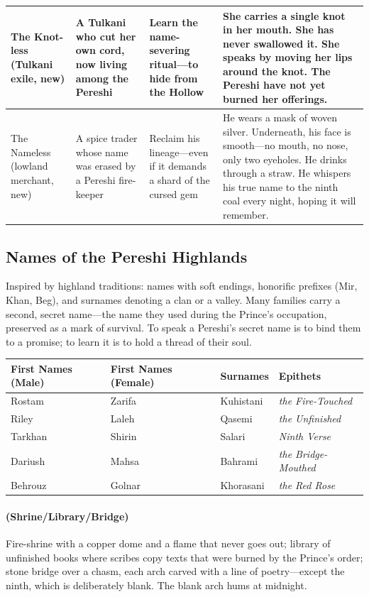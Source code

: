 \begin{longtable}{|p{}|p{}|p{}|p{}|}
\hline
The Knot-less (Tulkani exile, new) & A Tulkani who cut her own cord, now living among the Pereshi & Learn the name-severing ritual---to hide from the Hollow & She carries a single knot in her mouth. She has never swallowed it. She speaks by moving her lips around the knot. The Pereshi have not yet burned her offerings. \\
\hline
The Nameless (lowland merchant, new) & A spice trader whose name was erased by a Pereshi fire-keeper & Reclaim his lineage---even if it demands a shard of the cursed gem & He wears a mask of woven silver. Underneath, his face is smooth---no mouth, no nose, only two eyeholes. He drinks through a straw. He whispers his true name to the ninth coal every night, hoping it will remember. \\
\hline
\end{longtable}

\subsection*{Names of the Pereshi Highlands}
\label{sec:pereshi-names}

Inspired by highland traditions: names with soft endings, honorific prefixes (Mir, Khan, Beg), and surnames denoting a clan or a valley. Many families carry a second, secret name---the name they used during the Prince's occupation, preserved as a mark of survival. To speak a Pereshi's secret name is to bind them to a promise; to learn it is to hold a thread of their soul.

\begin{longtable}{|p{}|p{}|p{}|p{}|}
\hline
\textbf{First Names (Male)} & \textbf{First Names (Female)} & \textbf{Surnames} & \textbf{Epithets} \\
\hline
Rostam & Zarifa & Kuhistani & \textit{the Fire-Touched} \\
\hline
Riley & Laleh & Qasemi & \textit{the Unfinished} \\
\hline
Tarkhan & Shirin & Salari & \textit{Ninth Verse} \\
\hline
Dariush & Mahsa & Bahrami & \textit{the Bridge-Mouthed} \\
\hline
Behrouz & Golnar & Khorasani & \textit{the Red Rose} \\
\hline
\end{longtable}

\paragraph*{(Shrine/Library/Bridge)} Fire-shrine with a copper dome and a flame that never goes out; library of unfinished books where scribes copy texts that were burned by the Prince's order; stone bridge over a chasm, each arch carved with a line of poetry---except the ninth, which is deliberately blank. The blank arch hums at midnight.

